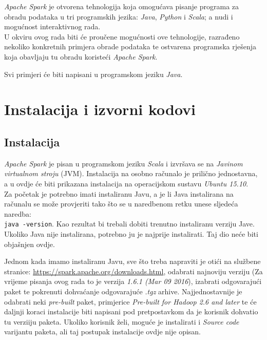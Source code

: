 \documentclass[times, utf8, zavrsni]{fer}
\begin{document}
\emph{Apache Spark} je otvorena  tehnologija koja omogućava pisanje programa za obradu podataka u tri programskih jezika: \emph{Java}, \emph{Python} i  \emph{Scala}; a nudi i mogućnost interaktivnog rada. \\
U okviru ovog rada biti će proučene mogućnosti ove tehnologije, razrađeno nekoliko konkretnih primjera obrade podataka te ostvarena programska rješenja koja obavljaju tu obradu koristeći \emph{Apache Spark}.

Svi primjeri će biti napisani u programskom jeziku \emph{Java}.

\section{Instalacija i izvorni kodovi}
\subsection{Instalacija}
\emph{Apache Spark} je pisan u programskom jeziku \emph{Scala} i izvršava se na \emph{Javinom virtualnom stroju}  (JVM). Instalacija na osobno računalo je prilično jednostavna, a u ovdje će biti prikazana instalacija na operacijskom sustavu \emph{Ubuntu 15.10}. \\
Za početak je potrebno imati instaliranu Javu, a je li Java instalirana na računalu se može provjeriti tako što se u naredbenom retku unese sljedeća naredba:\\
\texttt{java -version}. Kao rezultat bi trebali dobiti trenutno instaliranu verziju Jave. Ukoliko Java nije instalirana, potrebno ju je najprije instalirati. Taj dio neće biti objašnjen ovdje.

Jednom kada imamo instaliranu Javu, sve što treba napraviti je otići na službene stranice: \url{https://spark.apache.org/downloads.html}, odabrati najnoviju verziju (Za vrijeme pisanja ovog rada to je verzija \emph{1.6.1 (Mar 09 2016}), izabrati odgovarajući paket te pokrenuti dohvaćanje odgovarajuće \emph{.tgz} arhive. Najjednostavnije je odabrati neki \emph{pre-built} paket, primjerice \emph{Pre-built for Hadoop 2.6 and later} te će daljnji koraci instalacije biti napisani pod pretpostavkom da je korisnik dohvatio tu verziiju paketa. Ukoliko korisnik želi, moguće je instalirati i \emph{Source code} varijantu paketa, ali taj postupak instalacije ovdje nije opisan. 
\end{document}
